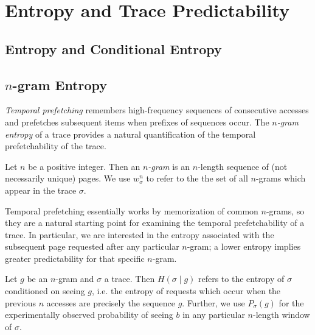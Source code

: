 \section{Entropy and Trace Predictability}

\subsection{Entropy and Conditional Entropy}


\subsection{$n$-gram Entropy}

\textit{Temporal prefetching} remembers high-frequency sequences of
consecutive accesses and prefetches subsequent items when prefixes of
sequences occur. The \textit{$n$-gram entropy} of a trace provides a natural
quantification of the temporal prefetchability of the trace.


\begin{definition}[$n$-gram] Let $n$ be a positive integer. Then an
  \textit{$n$-gram} is an $n$-length sequence of (not necessarily unique)
  pages. We use $w_\sigma^n$ to refer to the the set of all $n$-grams which
  appear in the trace $\sigma$. \end{definition}

Temporal prefetching essentially works by memorization of common $n$-grams, so
they are a natural starting point for examining the temporal prefetchability of
a trace. In particular, we are interested in the entropy associated with the
subsequent page requested after any particular $n$-gram; a lower entropy
implies greater predictability for that specific $n$-gram.

Let $g$ be an $n$-gram and $\sigma$ a trace. Then $H(\sigma \mid g)$ refers to
the entropy of $\sigma$ conditioned on seeing $g$, i.e. the entropy of requests
which occur when the previous $n$ accesses are precisely the sequence $g$.
Further, we use $P_\sigma(g)$ for the experimentally observed probability of
seeing $b$ in any particular $n$-length window of $\sigma$. 



